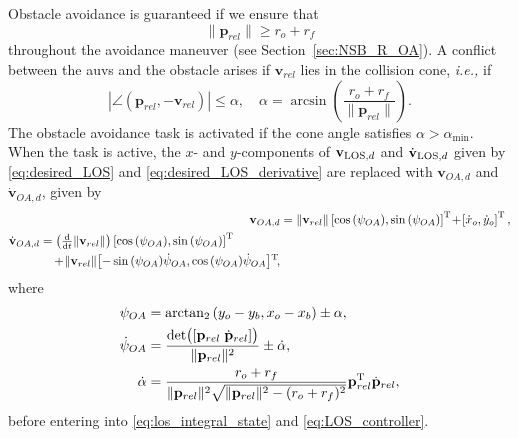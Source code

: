 Obstacle avoidance is guaranteed if we ensure that
\begin{equation}
    \|\mathbf{p}_{rel}\| \geq r_o + r_f
    \label{eq:obstacle_avoidance_condition}
\end{equation}
throughout the avoidance maneuver (see Section~\ref{sec:NSB_R_OA}).
A conflict between the \glspl{auv} and the obstacle arises if $\mathbf{v}_{rel}$ lies in the collision cone, \emph{i.e.,} if
\begin{equation}
    |\angle (\mathbf{p}_{rel}, -\mathbf{v}_{rel})| \leq \alpha ,\quad \alpha = \arcsin\left(\frac{r_o+r_f}{\|\mathbf{p}_{rel}\|}\right).
    \label{eq:collision-conflict}
\end{equation}
The obstacle avoidance task is activated if the cone angle satisfies $\alpha > \alpha_{\min}$. 
When the task is active, the $x$- and $y$-components of  $\mathbf{v}_{{\rm LOS}, d}$ and $\dot{\mathbf{v}}_{{\rm LOS}, d}$  given by \eqref{eq:desired_LOS} and \eqref{eq:desired_LOS_derivative} are replaced with $\mathbf{v}_{OA,d}$ and $\dot{\mathbf{v}}_{OA,d}$, given by
\begin{align}
    \mathbf{v}_{OA,d} &= \|\mathbf{v}_{rel}\| \left[\cos{(\psi_{OA})}, \sin{(\psi_{OA})}\right]\T \!+\! \left[\dot{x}_o, \dot{y}_o \right]\T,\label{eq:v_OA}\\
    \begin{split}\label{eq:v_OA_dot}
    \dot{\mathbf{v}}_{OA,d} &= \left(\scale[1]{\frac{\rm d}{{\rm d}t}}\|\mathbf{v}_{rel}\|\right)\left[ \cos{(\psi_{OA})}, \sin{(\psi_{OA})}\right]\T \\ & \quad + \!\|\mathbf{v}_{rel}\|\!\left[ -\sin{(\psi_{OA})}\dot{\psi}_{OA}, \cos{(\psi_{OA})} \dot{\psi}_{OA}\right]\!\T\!,
    \end{split}
\end{align}
where
\begin{align}
    \psi_{OA} &= \mathrm{arctan}_2 \left(y_o-y_b, x_o-x_b\right) \pm \alpha,\\
    \dot{\psi}_{OA} &= \frac{\mathrm{det}\bigl([\mathbf{p}_{rel}\; \dot{\mathbf{p}}_{rel}]\bigr)}{\|\mathbf{p}_{rel}\|^2} \pm \dot{\alpha},\\
    \dot{\alpha} &= \frac{r_o+r_f}{\|\mathbf{p}_{rel}\|^2\sqrt{\|\mathbf{p}_{rel}\|^2-(r_o+r_f)^2}}\mathbf{p}_{rel}^{\mathrm{T}} \dot{\mathbf{p}}_{rel},
\end{align}
 before entering into \eqref{eq:los_integral_state} and \eqref{eq:LOS_controller}.
 
